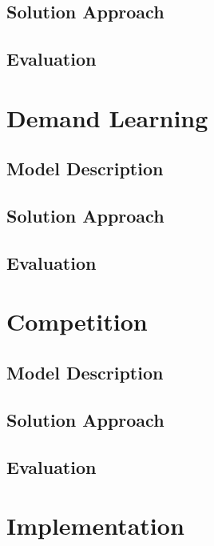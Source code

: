 \subsection{Solution Approach}
\subsection{Evaluation}

\section{Demand Learning}
\subsection{Model Description}
\subsection{Solution Approach}
\subsection{Evaluation}

\section{Competition}
\subsection{Model Description}
\subsection{Solution Approach}
\subsection{Evaluation}

\section{Implementation}
